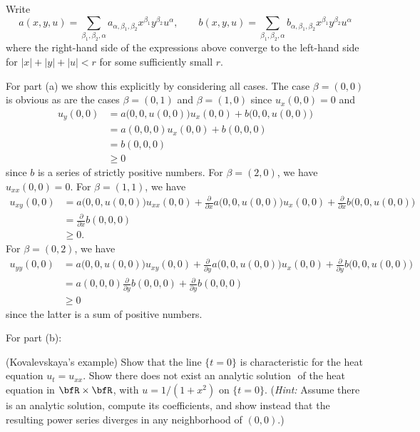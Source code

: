 \begin{solution}
  Write
  \[
    a(x,y,u)=\sum_{\beta_1,\beta_2,\alpha}
    a_{\alpha,\beta_1,\beta_2}x^{\beta_1}y^{\beta_2}u^\alpha,\qquad
    b(x,y,u)=\sum_{\beta_1,\beta_2,\alpha}
    b_{\alpha,\beta_1,\beta_2}x^{\beta_1}y^{\beta_2}u^\alpha
  \]
  where the right-hand side of the expressions above converge to the
  left-hand side for \(|x|+|y|+|u|<r\) for some sufficiently small \(r\).

  For part (a) we show this explicitly by considering all cases. The case
  \(\beta=(0,0)\) is obvious as are the cases \(\beta=(0,1)\) and
  \(\beta=(1,0)\) since \(u_x(0,0)=0\) and
  \begin{align*}
    u_y(0,0)
    &=a\bigl(0,0,u(0,0)\bigr)u_x(0,0)+b\bigl( 0,0,u(0,0) \bigr)\\
    &=a(0,0,0)u_x(0,0)+b(0,0,0)\\
    &=b(0,0,0)\\
    &\geq 0
  \end{align*}
  since \(b\) is a series of strictly positive numbers. For
  \(\beta=(2,0)\), we have \(u_{xx}(0,0)=0\). For \(\beta=(1,1)\), we have
  \begin{align*}
    u_{xy}(0,0)&=a\bigl(0,0,u(0,0)\bigr)u_{xx}(0,0)+\frac{\partial}{\partial
                 x}a\bigl( 0,0,u(0,0) \bigr)u_x(0,0)
                 +\frac{\partial}{\partial x} b\bigl(0,0,u(0,0)\bigr)\\
               &=\frac{\partial}{\partial x} b(0,0,0)\\
               &\geq 0.
  \end{align*}
  For \(\beta=(0,2)\), we have
  \begin{align*}
    u_{yy}(0,0)&=a\bigl(0,0,u(0,0)\bigr)u_{xy}(0,0)+\frac{\partial}{\partial
                 y}a\bigl( 0,0,u(0,0) \bigr)u_x(0,0)
                 +\frac{\partial}{\partial y} b\bigl(0,0,u(0,0)\bigr)\\
               &=a(0,0,0)\frac{\partial}{\partial
                 y}b(0,0,0)+\frac{\partial}{\partial y}b(0,0,0)\\
               &\geq 0
  \end{align*}
  since the latter is a sum of positive numbers.

  For part (b):
\end{solution}
\newpage

\begin{problem}
  (Kovalevskaya's example) Show that the line \(\{t=0\}\) is characteristic
  for the heat equation \(u_t=u_{xx}\). Show there does not exist an
  analytic solution \(\) of the heat equation in \(\bfR\times\bfR\), with
  \(u=1/(1+x^2)\) on \(\{t=0\}\). (\emph{Hint:} Assume there is an analytic
  solution, compute its coefficients, and show instead that the resulting
  power series diverges in any neighborhood of \((0,0)\).)
\end{problem}
\begin{solution}
\end{solution}

